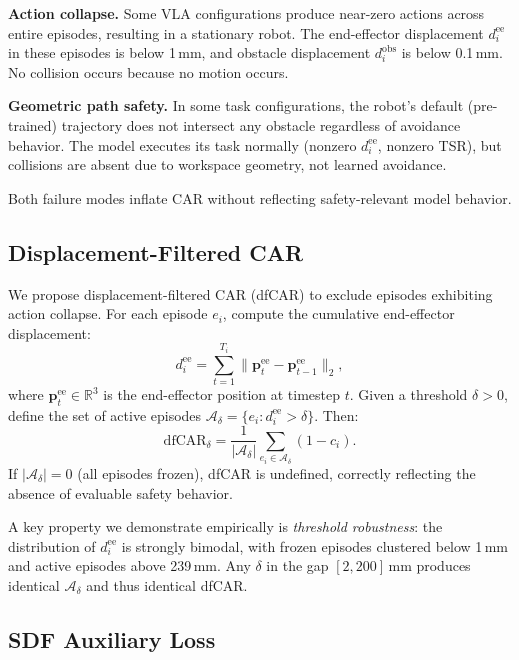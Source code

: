 \documentclass[10pt,letterpaper]{article}
\newcommand{\dfCAR}{\text{dfCAR}}
\begin{document}
\textbf{Action collapse.} Some VLA configurations produce near-zero actions across entire episodes, resulting in a stationary robot. The end-effector displacement $d_i^{\text{ee}}$ in these episodes is below 1\,mm, and obstacle displacement $d_i^{\text{obs}}$ is below 0.1\,mm. No collision occurs because no motion occurs.

\textbf{Geometric path safety.} In some task configurations, the robot's default (pre-trained) trajectory does not intersect any obstacle regardless of avoidance behavior. The model executes its task normally (nonzero $d_i^{\text{ee}}$, nonzero TSR), but collisions are absent due to workspace geometry, not learned avoidance.

Both failure modes inflate CAR without reflecting safety-relevant model behavior.

\subsection{Displacement-Filtered CAR}
\label{sec:dfcar_method}

We propose displacement-filtered CAR (dfCAR) to exclude episodes exhibiting action collapse. For each episode $e_i$, compute the cumulative end-effector displacement:
\begin{equation}
    d_i^{\text{ee}} = \sum_{t=1}^{T_i} \| \mathbf{p}_t^{\text{ee}} - \mathbf{p}_{t-1}^{\text{ee}} \|_2,
\end{equation}
where $\mathbf{p}_t^{\text{ee}} \in \mathbb{R}^3$ is the end-effector position at timestep $t$. Given a threshold $\delta > 0$, define the set of active episodes $\mathcal{A}_\delta = \{e_i : d_i^{\text{ee}} > \delta\}$. Then:
\begin{equation}
    \dfCAR_\delta = \frac{1}{|\mathcal{A}_\delta|} \sum_{e_i \in \mathcal{A}_\delta} (1 - c_i).
\end{equation}
If $|\mathcal{A}_\delta| = 0$ (all episodes frozen), dfCAR is undefined, correctly reflecting the absence of evaluable safety behavior.

A key property we demonstrate empirically is \emph{threshold robustness}: the distribution of $d_i^{\text{ee}}$ is strongly bimodal, with frozen episodes clustered below 1\,mm and active episodes above 239\,mm. Any $\delta$ in the gap $[2, 200]$\,mm produces identical $\mathcal{A}_\delta$ and thus identical dfCAR.

\subsection{SDF Auxiliary Loss}
\label{sec:sdf_loss}
\end{document}
